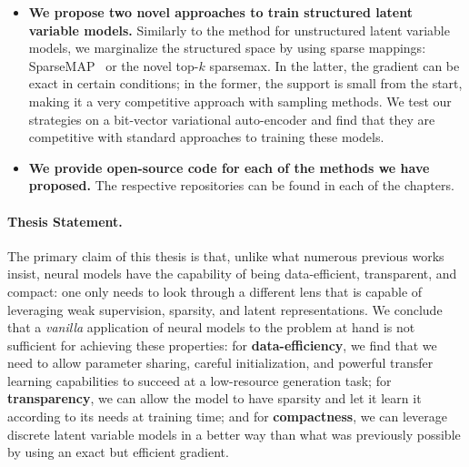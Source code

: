 \begin{itemize}
      \item \textbf{We propose two novel approaches to train structured latent variable models.}
            Similarly to the method for unstructured latent variable models, we marginalize
            the structured space by using sparse mappings: SparseMAP~\citep{niculae2018sparsemap} or the novel top-$k$
            sparsemax. In the latter, the gradient can be exact in certain conditions; in the former,
            the support is small from the start, making it a very competitive approach with sampling methods.
            We test our strategies on a bit-vector variational auto-encoder and find that
            they are competitive with standard approaches to training these models.

      \item \textbf{We provide open-source code for each of the
                  methods we have proposed.}
            The respective repositories can be found in each
            of the chapters.


\end{itemize}

\paragraph*{Thesis Statement.} The primary claim of this thesis is
that, unlike what numerous previous works insist, neural
models have the capability of being data-efficient, transparent, and
compact: one only needs to look through a different lens that is
capable of leveraging weak supervision, sparsity, and latent
representations. We conclude that a \textit{vanilla}
application of neural models to the problem at hand is not sufficient
for achieving these properties: for \textbf{data-efficiency}, we find that we need
to allow parameter sharing, careful initialization, and powerful
transfer learning capabilities to succeed at a low-resource
generation task; for \textbf{transparency}, we can allow the model to have
sparsity and let it learn it according to its needs at training time; and
for \textbf{compactness}, we can leverage discrete latent variable models in a
better way than what was previously possible by using an exact but
efficient gradient.
